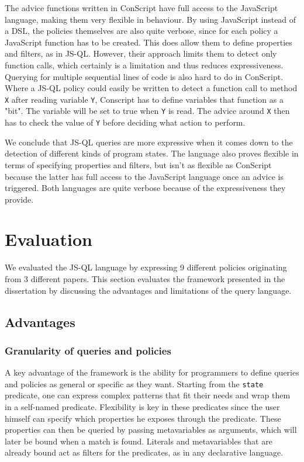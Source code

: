 The advice functions written in ConScript have full access to the JavaScript language, making them very flexible in behaviour. By using JavaScript instead of a DSL, the policies themselves are also quite verbose, since for each policy a JavaScript function has to be created. This does allow them to define properties and filters, as in JS-QL. However, their approach limits them to detect only function calls, which certainly is a limitation and thus reduces expressiveness. Querying for multiple sequential lines of code is also hard to do in ConScript. Where a JS-QL policy could easily be written to detect a function call to method \texttt{X} after reading variable \texttt{Y}, Conscript has to define variables that function as a "bit". The variable will be set to true when \texttt{Y} is read. The advice around \texttt{X} then has to check the value of \texttt{Y} before deciding what action to perform.

We conclude that JS-QL queries are more expressive when it comes down to the detection of different kinds of program states. The language also proves flexible in terms of specifying properties and filters, but isn't as flexible as ConScript because the latter has full access to the JavaScript language once an advice is triggered. Both languages are quite verbose because of the expressiveness they provide.


\section{Evaluation}
\label{sec:ValidationEvaluation}
We evaluated the JS-QL language by expressing 9 different policies originating from 3 different papers. This section evaluates the framework presented in the dissertation by discussing the advantages and limitations of the query language.

\subsection{Advantages}

\subsubsection*{Granularity of queries and policies}
A key advantage of the framework is the ability for programmers to define queries and policies as general or specific as they want. Starting from the \texttt{state} predicate, one can express complex patterns that fit their needs and wrap them in a self-named predicate. Flexibility is key in these predicates since the user himself can specify which properties he exposes through the predicate. These properties can then be queried by passing metavariables as arguments, which will later be bound when a match is found. Literals and metavariables that are already bound act as filters for the predicates, as in any declarative language.

